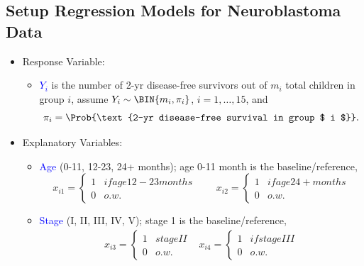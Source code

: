 \documentclass{article}\usepackage[]{graphicx}\usepackage[svgnames]{xcolor}
\begin{document}
\subsection*{Setup Regression Models for Neuroblastoma Data}
\begin{itemize}
    \item Response Variable:
          \begin{itemize}
              \item \textcolor{Blue}{$ Y_i $} is the number of 2-yr disease-free survivors out of $ m_i $ total children in
                    group $ i $, assume $ Y_i \sim \BIN{m_i,\pi_i} $, $ i=1,\ldots,15 $, and
                    \[ \pi_i=\Prob{\text{2-yr disease-free survival in group $ i $}}. \]
          \end{itemize}
    \item Explanatory Variables:
          \begin{itemize}
              \item \textcolor{Blue}{Age} (0-11, 12-23, 24+ months); age 0-11 month is the baseline/reference,
                    \[ x_{i1}  = \begin{cases*}
                            1 & if age 12-23 months \\
                            0 & o.w.
                        \end{cases*} \qquad
                        x_{i2}  = \begin{cases*}
                            1 & if age 24+ months \\
                            0 & o.w.
                        \end{cases*} \]
              \item \textcolor{Blue}{Stage} (I, II, III, IV, V); stage 1 is the baseline/reference,
                    \[ \begin{array}{ll}
                            x_{i3} = \begin{cases*}
                                         1 & stage II \\
                                         0 & o.w.
                                     \end{cases*}  &
                            x_{i4}  = \begin{cases*}
                                          1 & if stage III \\
                                          0 & o.w.
                                      \end{cases*} \\

\end{array}\]
\end{itemize}
\end{itemize}
\end{document}
